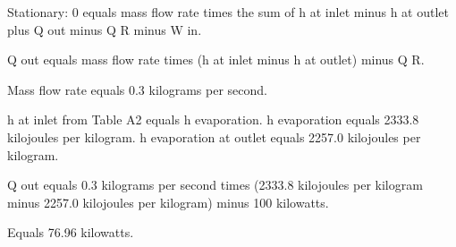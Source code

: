 Stationary:  
0 equals mass flow rate times the sum of h at inlet minus h at outlet plus Q out minus Q R minus W in.  

Q out equals mass flow rate times (h at inlet minus h at outlet) minus Q R.  

Mass flow rate equals 0.3 kilograms per second.  

h at inlet from Table A2 equals h evaporation.  
h evaporation equals 2333.8 kilojoules per kilogram.  
h evaporation at outlet equals 2257.0 kilojoules per kilogram.  

Q out equals 0.3 kilograms per second times (2333.8 kilojoules per kilogram minus 2257.0 kilojoules per kilogram) minus 100 kilowatts.  

Equals 76.96 kilowatts.